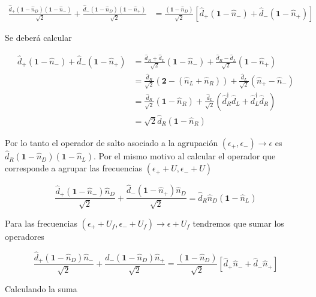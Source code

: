 \begin{appendixs}
\begin{align*}
    \frac{\hat{d}_{+}(\textbf{1}-\hat{n}_{D})(\textbf{1}-\hat{n}_{-}) }{\sqrt{2}} + \frac{\hat{d}_{-}(\textbf{1}-\hat{n}_{D})(\textbf{1}-\hat{n}_{+}) }{\sqrt{2}} & = \frac{(\textbf{1} - \hat{n}_{D})}{\sqrt{2}}[\hat{d}_{+}(\textbf{1}-\hat{n}_{-}) + \hat{d}_{-}(\textbf{1}-\hat{n}_{+})]
\end{align*}

Se deberá calcular 

\begin{align*}
    \hat{d}_{+}(\textbf{1}-\hat{n}_{-}) + \hat{d}_{-}(\textbf{1}-\hat{n}_{+}) & =  \frac{\hat{d}_{R} + \hat{d}_{L}}{\sqrt{2}}(\textbf{1} - \hat{n}_{-}) + \frac{\hat{d}_{R} - \hat{d}_{L}}{\sqrt{2}}(\textbf{1} - \hat{n}_{+})   \\
    & = \frac{\hat{d}_{R}}{\sqrt{2}}(\textbf{2} - (\hat{n}_{L} + \hat{n}_{R})) + \frac{\hat{d}_{L}}{\sqrt{2}} (\hat{n}_{+}-\hat{n}_{-}) \\
    & = \frac{\hat{d}_{R}}{\sqrt{2}}(\textbf{1} -  \hat{n}_{R}) + \frac{\hat{d}_{L}}{\sqrt{2}} (\hat{d}^{\dagger}_{R}\hat{d}_{L} + \hat{d}^{\dagger}_{L}\hat{d}_{R}) \\
    & = \sqrt{2}\hat{d}_{R}(\textbf{1}-\hat{n}_{R})
\end{align*}

Por lo tanto el operador de salto asociado a la agrupación $(\epsilon_{+},\epsilon_{-})\to \epsilon$ es $\hat{d}_{R}(\textbf{1}-\hat{n}_{D})(\textbf{1}-\hat{n}_{L})$. Por el mismo motivo al calcular el operador que corresponde a agrupar las frecuencias $(\epsilon_{+}+U,\epsilon_{-}+U)$ 

\begin{equation*}
    \frac{\hat{d}_{+}(\textbf{1}-\hat{n}_{-})\hat{n}_{D}}{\sqrt{2}} + \frac{\hat{d}_{-}(\textbf{1}-\hat{n}_{+})\hat{n}_{D}}{\sqrt{2}}  = \hat{d}_{R}\hat{n}_{D}(\textbf{1}-\hat{n}_{L})
\end{equation*}

Para las frecuencias $(\epsilon_{+}+U_{f},\epsilon_{-}+U_{f})\to \epsilon + U_{f}$ tendremos que sumar los operadores

\begin{equation*}
    \frac{\hat{d}_{+}(\textbf{1}-\hat{n}_{D})\hat{n}_{-} }{\sqrt{2}} + \frac{\hat{d}_{-}(\textbf{1}-\hat{n}_{D})\hat{n}_{+} }{\sqrt{2}} = \frac{(\textbf{1}-\hat{n}_{D})}{\sqrt{2}} [\hat{d}_{+}\hat{n}_{-} + \hat{d}_{-}\hat{n}_{+}]
\end{equation*}

Calculando la suma


\end{appendixs}
